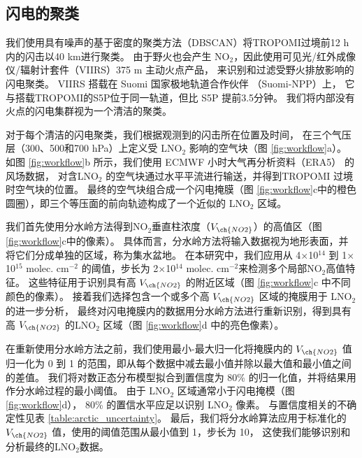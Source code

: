 \subsection*{闪电的聚类}

我们使用具有噪声的基于密度的聚类方法（DBSCAN）将TROPOMI过境前12 h内\citep{Allen.2021a}的闪击以40 km进行聚类\citep{backlund2011density,Schubert.2017}。
由于野火也会产生 NO$_2$，因此使用可见光/红外成像仪/辐射计套件（VIIRS）375 m 主动火点产品，
来识别和过滤受野火排放影响的闪电聚类。
VIIRS 搭载在 Suomi 国家极地轨道合作伙伴 （Suomi-NPP）上，
它与搭载TROPOMI的S5P位于同一轨道，但比 S5P 提前3.5分钟。
我们将内部没有火点的闪电集群视为一个清洁的聚类。

对于每个清洁的闪电聚类，我们根据观测到的闪击所在位置及时间，
在三个气压层（300、500和700 hPa）上定义受 LNO$_2$ 影响的空气块（图 \ref{fig:workflow}a）。
如图 \ref{fig:workflow}b 所示，我们使用 ECMWF 小时大气再分析资料（ERA5） 的风场数据\citep{Hersbach.2020}，
对含LNO$_2$ 的空气块通过水平平流进行输送，并得到TROPOMI 过境时空气块的位置。
最终的空气块组合成一个闪电掩膜（图 \ref{fig:workflow}c中的橙色圆圈），即三个等压面的前向轨迹构成了一个近似的 LNO$_2$ 区域。

我们首先使用分水岭方法得到NO$_2$垂直柱浓度（$V_{\ch{NO2}}$）的高值区（图 \ref{fig:workflow}c中的像素）。
具体而言，分水岭方法将输入数据视为地形表面，并将它们分成单独的区域，称为集水盆地\citep{Soille.1990,Heikenfeld.2019a}。
在本研究中，我们应用从 4$\times$10$^{14}$ 到 1$\times$10$^{15}$ molec. cm$^{-2}$ 的阈值，步长为 2$\times$10$^{14}$ molec. cm$^{-2}$来检测多个局部NO$_2$高值特征。
这些特征用于识别具有高 $V_{\ch{NO2}}$ 的附近区域（图 \ref{fig:workflow}c 中不同颜色的像素）。
接着我们选择包含一个或多个高 $V_{\ch{NO2}}$ 区域的掩膜用于 LNO$_2$ 的进一步分析，
最终对闪电掩膜内的数据用分水岭方法进行重新识别，得到具有高 $V_{\ch{NO2}}$ 的LNO$_2$ 区域（图 \ref{fig:workflow}d 中的亮色像素）。

在重新使用分水岭方法之前，我们使用最小-最大归一化将掩膜内的 $V_{\ch{NO2}}$ 值归一化为 0 到 1 的范围，即从每个数据中减去最小值并除以最大值和最小值之间的差值。
我们将对数正态分布模型拟合到置信度为 80\% 的归一化值，并将结果用作分水岭过程的最小阈值。
由于 LNO$_2$ 区域通常小于闪电掩模（图 \ref{fig:workflow}d），
80\% 的置信水平应足以识别 LNO$_2$ 像素。
与置信度相关的不确定性见表 \ref{table:arctic_uncertainty}。
最后，我们将分水岭算法应用于标准化的 $V_{\ch{NO2}}$ 值，使用的阈值范围从最小值到 1，步长为 10，
这使我们能够识别和分析最终的LNO$_2$数据。


